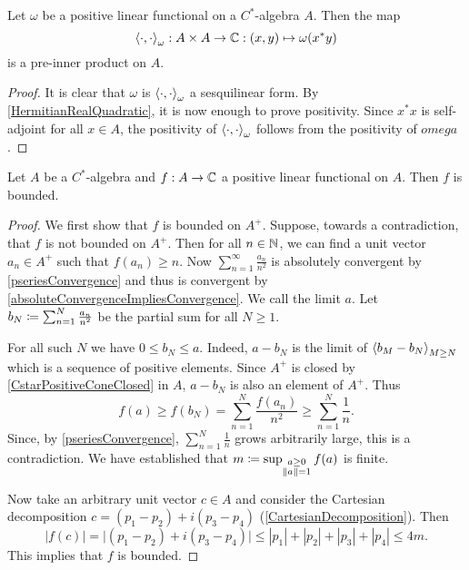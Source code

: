 \begin{lemma} \label{positiveLinearFunctionalPreinnerProduct}
Let $\omega$ be a positive linear functional on a $C^*$-algebra $A$. Then the map
\[ \inner{\cdot, \cdot}_\omega: A\times A \to \C: (x,y)\mapsto \omega(x^*y) \]
is a pre-inner product on $A$.
\end{lemma}
\begin{proof}
It is clear that $\omega$ is $\inner{\cdot, \cdot}_\omega$ a sesquilinear form. By \ref{HermitianRealQuadratic}, it is now enough to prove positivity. Since $x^*x$ is self-adjoint for all $x\in A$, the positivity of $\inner{\cdot, \cdot}_\omega$ follows from the positivity of $omega$.
\end{proof}

\begin{proposition} \label{positiveLinearFunctionalBounded}
Let $A$ be a $C^*$-algebra and $f: A\to \mathbb{C}$ a positive linear functional on $A$. Then $f$ is bounded.
\end{proposition}
\begin{proof}
We first show that $f$ is bounded on $A^+$. Suppose, towards a contradiction, that $f$ is not bounded on $A^+$. Then for all $n\in \mathbb{N}$, we can find a unit vector $a_n\in A^+$ such that $f(a_n) \geq n$. Now $\sum_{n=1}^\infty \frac{a_n}{n^2}$ is absolutely convergent by \ref{pseriesConvergence} and thus is convergent by \ref{absoluteConvergenceImpliesConvergence}. We call the limit $a$. Let $b_N \coloneqq \sum_{n=1}^N \frac{a_n}{n^2}$ be the partial sum for all $N\geq 1$.

For all such $N$ we have $0 \leq b_N \leq a$. Indeed, $a-b_N$ is the limit of $\left\langle b_M - b_N \right\rangle_{M\geq N}$ which is a sequence of positive elements. Since $A^+$ is closed by \ref{CstarPositiveConeClosed} in $A$, $a-b_N$ is also an element of $A^+$. Thus
\[ f(a) \geq f(b_N) = \sum_{n=1}^N \frac{f(a_n)}{n^2} \geq \sum_{n=1}^N \frac{1}{n}. \]
Since, by \ref{pseriesConvergence}, $\sum_{n=1}^N \frac{1}{n}$ grows arbitrarily large, this is a contradiction. We have established that $m \coloneqq\sup_{\substack{a \geq 0  \\ \lVert a\rVert = 1}} f(a)$ is finite.

Now take an arbitrary unit vector $c\in A$ and consider the Cartesian decomposition $c = (p_1 - p_2) + i(p_3 - p_4)$ (\ref{CartesianDecomposition}). Then
\[ |f(c)| = \big|(p_1 - p_2) + i(p_3 - p_4)\big| \leq |p_1| + |p_2| + |p_3| + |p_4| \leq 4m. \]
This implies that $f$ is bounded.
\end{proof}

